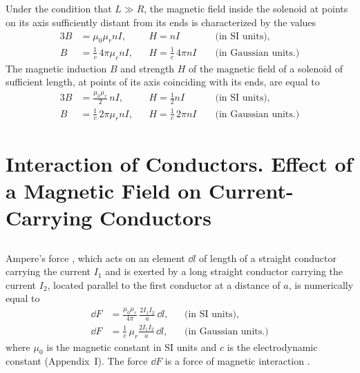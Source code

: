 \subsection{}\label{23.3.9} Under the condition that $L \gg R$, the magnetic field inside the solenoid at points on its axis sufficiently distant from its ends is characterized by the values
\begin{alignat*}{3}%
B & = \mu_{0} \mu_{r}nI, && H  = nI &&  \text{(in SI units),} \\
B & =  \frac{1}{c} \, 4 \pi \mu_{r} n I,   && H  = \frac{1}{c} \,4 \pi nI\,\, &&  \text{(in Gaussian units.)}
\end{alignat*}
The magnetic induction $B$ and strength $H$ of the magnetic field of a solenoid of sufficient length, at points of its axis coinciding with its ends, are equal to
\begin{alignat*}{3}%
B & = \frac{\mu_{0} \mu_{r}}{2}\, nI, && H  = \frac{1}{2}nI &&  \text{(in SI units),} \\
B & =  \frac{1}{c} \, {2 \pi \mu_{r} n I},   && H  =\frac{1}{c} \,2 \pi nI\,\, &&  \text{(in Gaussian units.)}
\end{alignat*}

\section[Interaction of Conductors]{Interaction of Conductors. Effect of a Magnetic Field on Current-Carrying Conductors}\label{sec-23.4}

\subsection{}\label{23.4.1} Ampere's force , which acts on an element $\dd l$ of length of a straight conductor carrying the current $I_{1}$ and is exerted by a long straight conductor carrying the current $I_{2}$, located parallel to the first conductor at a distance of $a$, is numerically equal to
\begin{align*}%
\dd F & = \frac{\mu_{0} \mu_{r}}{4 \pi}\, \frac{2I_{1}I_{2}}{a} \, \dd l, &&  \text{(in SI units),} \\
\dd F & =  \frac{1}{c} \, \mu_{r} \frac{2I_{1}I_{2}}{a} \, \dd l, &&  \text{(in Gaussian units.)}
\end{align*}
where $\mu_{0}$ is the magnetic constant in SI units  and $c$ is the electrodynamic constant (Appendix~I). The force $\dd F$ is a force of magnetic interaction .

